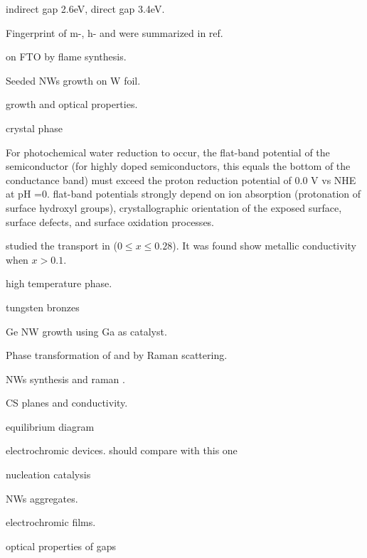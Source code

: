  indirect gap 2.6eV, direct gap 3.4eV. \cite{Koffyberg1979}

Fingerprint of m-, h- and  were summarized in ref\cite{Daniel1987}.

 on FTO by flame synthesis.\cite{Rao2014} \cite{Xu2006}

Seeded  NWs growth on W foil.\cite{Hong2006a}

 growth and optical properties. \cite{Oishi2001} \cite{Itoh2001}

 crystal phase \cite{Viswanathan1974}

For photochemical water reduction to occur, the flat-band potential of the semiconductor (for highly doped semiconductors, this equals the bottom of the conductance band) must exceed the proton reduction potential of 0.0 V vs NHE at pH =0. \cite{Osterloh2008} flat-band potentials strongly depend on ion absorption (protonation of surface hydroxyl groups), crystallographic orientation of the exposed surface, surface defects, and surface oxidation processes.

\citeauthor{Salje1984} studied the transport in  ($0\leq x \leq 0.28$).\cite{Salje1984} It was found  show metallic conductivity when $x > 0.1$.

  \cite{Migas2010}

  high temperature phase. \cite{Vogt1999}

 tungsten bronzes \cite{Wiseman1976}

 Ge NW growth using Ga as catalyst. \cite{Chandrasekaran2006}

 Phase transformation of  and  by Raman scattering. \cite{Lima2011}

  NWs synthesis and raman \cite{Ma2005}.

  CS planes and conductivity.\cite{Sahle1983}

  equilibrium diagram \cite{Wriedt1989}

  electrochromic devices.\cite{Liu2013d} should compare with this one \cite{Wang2008}

  nucleation catalysis \cite{Turnbull1952}

   NWs aggregates. \cite{Kozan2008a}

  electrochromic films. \cite{Yoshimura1985}

  optical properties of  gaps\cite{Saygin-Hinczewski2008}

